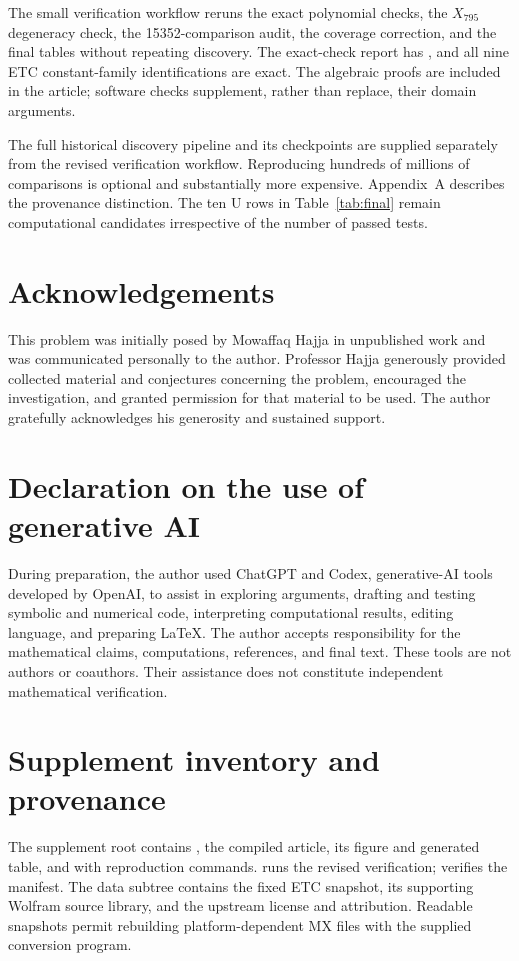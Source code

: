 \documentclass[11pt]{article}
\begin{document}
The small verification workflow reruns the exact polynomial checks, the
$X_{795}$ degeneracy check, the 15352-comparison audit, the coverage
correction, and the final tables without repeating discovery.
The exact-check report has , and all nine ETC
constant-family identifications are exact.  The algebraic proofs are
included in the article; software checks supplement, rather than replace,
their domain arguments.

The full historical discovery pipeline and its checkpoints are supplied
separately from the revised verification workflow.  Reproducing hundreds
of millions of comparisons is optional and substantially more expensive.
Appendix~A describes the provenance distinction.  The ten U rows in
Table~\ref{tab:final} remain computational candidates irrespective of
the number of passed tests.

\section*{Acknowledgements}

This problem was initially posed by Mowaffaq Hajja in unpublished work and
was communicated personally to the author.  Professor Hajja generously
provided collected material and conjectures concerning the problem,
encouraged the investigation, and granted permission for that material to be
used.  The author gratefully acknowledges his generosity and sustained
support.

\section*{Declaration on the use of generative AI}

During preparation, the author used ChatGPT and Codex, generative-AI
tools developed by OpenAI, to assist in exploring arguments, drafting and
testing symbolic and numerical code, interpreting computational results,
editing language, and preparing \LaTeX.  The author accepts responsibility
for the mathematical claims, computations, references, and final text.
These tools are not authors or coauthors.  Their assistance does not
constitute independent mathematical verification.

\appendix
\section{Supplement inventory and provenance}

The supplement root contains , the compiled article, its
figure and generated table, and  with reproduction commands.
 runs the revised verification;
 verifies the manifest.
The data subtree  contains the fixed ETC
snapshot, its supporting Wolfram source library, and the upstream license
and attribution.  Readable snapshots permit rebuilding platform-dependent
MX files with the supplied conversion program.
\end{document}
